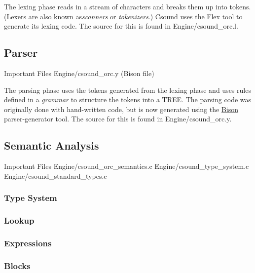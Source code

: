 \documentclass[]{book}
\begin{document}
The lexing phase reads in a stream of characters and breaks them up into
tokens. (Lexers are also known as\emph{scanners} or \emph{tokenizers}.)
Csound uses the \href{http://flex.sourceforge.net/}{Flex} tool to
generate its lexing code. The source for this is found in
Engine/csound\_orc.l.


\subsection{Parser}

\begin{bclogo}[couleur=blue!30,arrondi=0.1,ombre=true,logo=\bcetoile]
{Important Files}
Engine/csound\_orc.y (Bison file)
\end{bclogo}

The parsing phase uses the tokens generated from the lexing phase and
uses rules defined in a \emph{grammar} to structure the tokens into a
TREE. The parsing code was originally done with hand-written code, but
is now generated using the
\href{http://www.gnu.org/software/bison/}{Bison} parser-generator tool.
The source for this is found in Engine/csound\_orc.y.


\subsection{Semantic Analysis}

\begin{bclogo}[couleur=blue!30,arrondi=0.1,ombre=true,logo=\bcetoile]
{Important Files}
Engine/csound\_orc\_semantics.c 
Engine/csound\_type\_system.c 
Engine/csound\_standard\_types.c 
\end{bclogo}

\subsubsection{Type System}

\subsubsection{Lookup}

\subsubsection{Expressions}

\subsubsection{Blocks}
\end{document}

